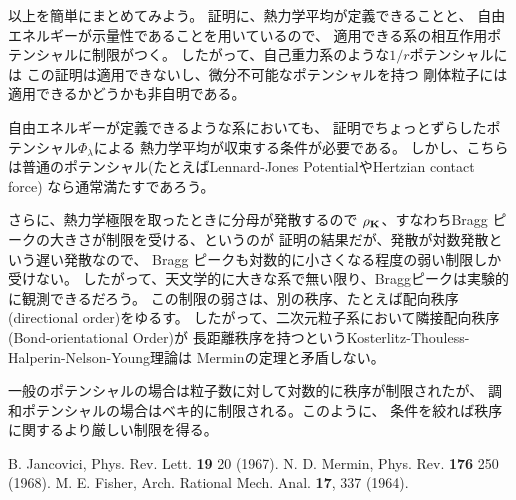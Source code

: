 \documentclass{jarticle}
\renewcommand{\v}[1]{{\bf #1}}
\begin{document}
以上を簡単にまとめてみよう。
証明に、熱力学平均が定義できることと、
自由エネルギーが示量性であることを用いているので、
適用できる系の相互作用ポテンシャルに制限がつく。
したがって、自己重力系のような$1/r$ポテンシャルには
この証明は適用できないし、微分不可能なポテンシャルを持つ
剛体粒子には適用できるかどうかも非自明である。

自由エネルギーが定義できるような系においても、
証明でちょっとずらしたポテンシャル$\Phi_{\lambda}$による
熱力学平均が収束する条件が必要である。
しかし、こちらは普通のポテンシャル(たとえばLennard-Jones PotentialやHertzian contact force)
なら通常満たすであろう。

さらに、熱力学極限を取ったときに分母が発散するので
$\rho_{\v{K}}$、すなわちBragg ピークの大きさが制限を受ける、というのが
証明の結果だが、発散が対数発散という遅い発散なので、
Bragg ピークも対数的に小さくなる程度の弱い制限しか受けない。
したがって、天文学的に大きな系で無い限り、Braggピークは実験的に観測できるだろう。
この制限の弱さは、別の秩序、たとえば配向秩序(directional order)をゆるす。
したがって、二次元粒子系において隣接配向秩序(Bond-orientational Order)が
長距離秩序を持つというKosterlitz-Thouless-Halperin-Nelson-Young理論は
Merminの定理と矛盾しない。

一般のポテンシャルの場合は粒子数に対して対数的に秩序が制限されたが、
調和ポテンシャルの場合はベキ的に制限される。このように、
条件を絞れば秩序に関するより厳しい制限を得る。

\begin{thebibliography}{99}
   B. Jancovici, Phys. Rev. Lett. {\bf 19} 20 (1967).
   N. D. Mermin, Phys. Rev. {\bf 176} 250 (1968).
   M. E. Fisher, Arch. Rational Mech. Anal. {\bf 17}, 337 (1964).
\end{thebibliography}
\end{document}
